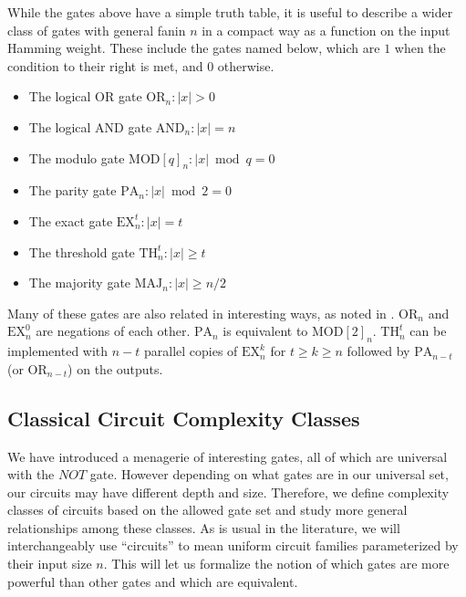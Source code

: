 While the gates above have a simple truth table, it is
useful to describe a wider class of gates with general
fanin $n$ in a compact way as a function on the input
Hamming weight. These include the gates named below, which
are $1$ when the condition to their right is met, and $0$
otherwise.
%
\begin{itemize}
\item The logical OR gate $\text{OR}_n: |x| > 0$
\item The logical AND gate $\text{AND}_n: |x| = n$
\item The modulo gate $\text{MOD}[q]_n: |x| \bmod q = 0$
\item The parity gate $\text{PA}_n: |x| \bmod 2 = 0$
\item The exact gate $\text{EX}^t_n: |x| = t$
\item The threshold gate $\text{TH}^t_n: |x| \ge t$
\item The majority gate $\text{MAJ}_n: |x| \ge n/2$
\end{itemize}
%
Many of these gates are also related in interesting ways,
as noted in \cite{Takahashi2011}.
$\text{OR}_n$ and $\text{EX}^0_n$ are
negations of each other. $\text{PA}_n$ is equivalent to
$\text{MOD}[2]_n$. $\text{TH}^t_n$ can be implemented with
$n-t$ parallel copies of $\text{EX}^k_n$ for $t \ge k \ge n$
followed by $\text{PA}_{n-t}$ (or $\text{OR}_{n-t}$) on the outputs.

\subsection{Classical Circuit Complexity Classes}

We have introduced a menagerie of interesting gates,
all of which are universal with the $NOT$ gate. However depending
on what gates are in our universal set, our circuits may have
different depth and size. Therefore, we define complexity classes
of circuits based on the allowed gate set and study more general
relationships among these classes. As is usual in the literature,
we will interchangeably use ``circuits'' to mean uniform
circuit families parameterized by their input size $n$.
 This will let us formalize the notion of
which gates are more powerful than other gates and which are equivalent.
 
